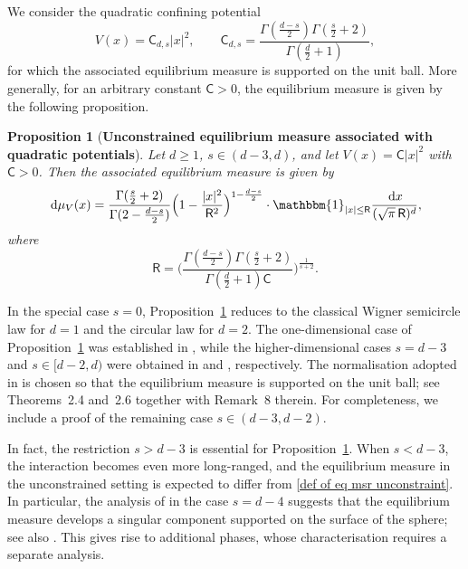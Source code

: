 \documentclass{amsart}
\newcommand{\ud}{\, \mathrm{d}}
\theoremstyle{plain}
\newtheorem{prop}[thm]{Proposition}
\theoremstyle{remark}
\numberwithin{equation}{section}
\begin{document}
We consider the quadratic confining potential
\begin{equation}\label{def of quad potential no constraint}
  V(x)= \mathsf{C}_{d,s}   |x|^2, \qquad
  \mathsf{C}_{d,s} 
  =
  \frac{\Gamma(\frac{d-s}{2})\Gamma(\frac{s}{2}+2)}
       {\Gamma(\frac d2+1)},
\end{equation}
for which the associated equilibrium measure is supported on the
unit ball. More generally, for an arbitrary constant $\mathsf{C}>0$,
the equilibrium measure is given by the following proposition.

\begin{prop}[\textbf{Unconstrained equilibrium measure associated with quadratic potentials}] \label{Prop_eq msr unconstrained}
Let $d\ge1$, $s\in(d-3,d)$, and let
$V(x)=\mathsf{C}|x|^2$ with $\mathsf{C}>0$.
Then the associated equilibrium measure is given by 
\begin{equation} \label{def of eq msr unconstraint}
    \ud \mu_V(x)= \frac{\Gamma(\frac{s}{2}+2)}{\Gamma(2-\frac{d-s}{2}) }\Big(1- \frac{|x|^2}{ \mathsf{R}^2}\Big)^{ 1-\frac{d-s}{2} } \cdot \mathbbm{1}_{|x|\le \mathsf{R} } \frac{ \ud x }{ (\sqrt{\pi} \, \mathsf{R})^d },   
\end{equation}
where 
\begin{equation} \label{def of radius R unconstraint}
    \mathsf{R} =\bigg(\frac{\Gamma(\frac{d-s}{2})\Gamma(\tfrac{s}{2}+2) }{\Gamma(\frac{d}{2}+1)\mathsf{C}}\bigg)^{\frac{1}{s+2}} . 
\end{equation} 
\end{prop}


 

In the special case $s=0$, Proposition~\ref{Prop_eq msr unconstrained}
reduces to the classical Wigner semicircle law for $d=1$ and the
circular law for $d=2$. The one-dimensional case of Proposition~\ref{Prop_eq msr unconstrained} was established in \cite{ADKKMMS19}, while the higher-dimensional cases $s=d-3$ and $s\in[d-2,d)$ were obtained in
\cite{CSW22} and \cite{BFMS26}, respectively. The normalisation adopted
in \cite{BFMS26} is chosen so that the equilibrium measure is supported
on the unit ball; see Theorems~2.4 and~2.6 together with Remark~8
therein. For completeness, we include a proof of the remaining case
$s\in(d-3,d-2)$. 

In fact, the restriction \(s>d-3\) is essential for Proposition~\ref{Prop_eq msr unconstrained}. When \(s<d-3\), the interaction becomes even more long-ranged, and the equilibrium measure in the unconstrained setting is expected to differ from \eqref{def of eq msr unconstraint}. In particular, the analysis of \cite{CSW23} in the case \(s=d-4\) suggests that the equilibrium measure develops a singular component supported on the surface of the sphere; see also \cite{CMSVW25}. This gives rise to additional phases, whose characterisation requires a separate analysis. 
\end{document}

